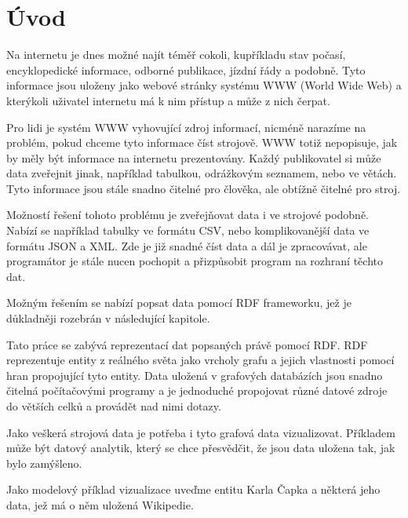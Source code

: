\chapter*{Úvod}

Na internetu je dnes možné najít téměř cokoli, kupříkladu stav počasí, encyklopedické informace, odborné publikace, jízdní řády a podobně. Tyto informace jsou uloženy jako webové stránky systému WWW (World Wide Web) a kterýkoli uživatel internetu má k nim přístup a může z nich čerpat.

Pro lidi je systém WWW vyhovující zdroj informací, nicméně narazíme na problém, pokud chceme tyto informace číst strojově. WWW totiž nepopisuje, jak by měly být informace na internetu prezentovány. Každý publikovatel si může data zveřejnit jinak, například tabulkou, odrážkovým seznamem, nebo ve větách. Tyto informace jsou stále snadno čitelné pro člověka, ale obtížně čitelné pro stroj.

Možností řešení tohoto problému je zveřejňovat data i ve strojové podobně. Nabízí se například tabulky ve formátu CSV, nebo komplikovanější data ve formátu JSON a XML. Zde je již snadné číst data a dál je zpracovávat, ale programátor je stále nucen pochopit a přizpůsobit program na rozhraní těchto dat.

Možným řešením se nabízí popsat data pomocí RDF frameworku, jež je důkladněji rozebrán v následující kapitole.

\bigskip

Tato práce se zabývá reprezentací dat popsaných právě pomocí RDF. RDF reprezentuje entity z reálného světa jako vrcholy grafu a jejich vlastnosti pomocí hran propojující tyto entity. Data uložená v grafových databázích jsou snadno čitelná počítačovými programy a je jednoduché propojovat různé datové zdroje do větších celků a provádět nad nimi dotazy.

Jako veškerá strojová data je potřeba i tyto grafová data vizualizovat. Příkladem může být datový analytik, který se chce přesvědčit, že jsou data uložena tak, jak bylo zamýšleno.

Jako modelový příklad vizualizace uveďme entitu Karla Čapka a některá jeho data, jež má o něm uložená Wikipedie.

